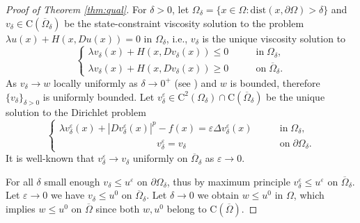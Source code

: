 \documentclass[11pt,reqno]{amsart}
\numberwithin{figure}{section}
\theoremstyle{plain}
\theoremstyle{remark}
\numberwithin{equation}{section}
\newcommand{\rmC}{\mathrm{C}}
\begin{document}
\begin{proof}[Proof of Theorem \ref{thm:qual}]
For $\delta>0$, let $\Omega_\delta = \{x\in \Omega: \mathrm{dist}(x,\partial \Omega) > \delta\}$ and $v_\delta\in\rmC(\overline{\Omega}_\delta)$ be the state-constraint viscosity solution to the problem $\lambda u(x) + H(x,Du(x)) = 0$ in $\Omega_\delta$, i.e., $v_\delta$ is the unique viscosity solution to
\begin{equation}\label{e:v_v}
    \begin{cases}
    \lambda v_\delta(x) + H(x,Dv_\delta(x)) \leq 0 &\qquad\text{in}\;\Omega_\delta,\\
    \lambda v_\delta(x) + H(x,Dv_\delta(x)) \geq 0 &\qquad\text{on}\;\overline{\Omega}_\delta.
    \end{cases}
\end{equation}
As $v_\delta\rightarrow w$ locally uniformly as $\delta\rightarrow 0^+$ (see \cite{kim_state-constraint_2020}) and $w$ is bounded, therefore $\{v_\delta\}_{\delta>0}$ is uniformly bounded. Let $v^\varepsilon_\delta\in \rmC^2(\Omega_\delta)\cap \rmC(\overline{\Omega}_\delta)$ be the unique solution to the Dirichlet problem
\begin{equation}\label{eq:vv_eps}
\begin{cases}
    \lambda v_\delta^\varepsilon(x) + |Dv_\delta^\varepsilon(x)|^p - f(x) = \varepsilon \Delta v_\delta^\varepsilon(x) &\qquad\text{in}\;\Omega_\delta,\\
    \;\;\;\,\quad\qquad\qquad\qquad\qquad v_\delta^\varepsilon = v_\delta &\qquad \text{on}\;\partial\Omega_\delta.
\end{cases}
\end{equation}
It is well-known that $v^\varepsilon_\delta\to v_\delta$ uniformly on $\overline{\Omega}_\delta$ as $\varepsilon\to 0$.

For all $\delta$ small enough $v_\delta\leq u^\varepsilon$ on $\partial \Omega_\delta$, thus by maximum principle $v^\varepsilon_\delta \leq u^\varepsilon$ on $\overline{\Omega}_\delta$. Let $\varepsilon\to 0$ we have $v_\delta \leq u^0$ on $\overline{\Omega}_\delta$.
Let $\delta\rightarrow 0$ we obtain $w\leq u^0$ in $\Omega$, which implies $w\leq u^0$ on $\overline{\Omega}$ since both $w,u^0$ belong to $\rmC(\overline{\Omega})$.
\end{proof}
\end{document}
